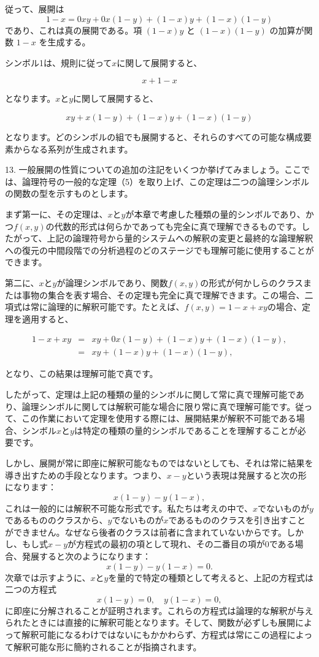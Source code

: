 \documentclass[a4paper,11pt,openany]{ltjsbook}
\begin{document}
従って、展開は
\[
1 - x = 0xy + 0x(1 - y) + (1 - x)y + (1 - x)(1 - y)
\]
であり、これは真の展開である。項 \( (1 - x)y \) と \( (1 - x)(1 - y) \) の加算が関数 \( 1 - x \) を生成する。

シンボル1は、規則に従って$x$に関して展開すると、

\[
x + 1 - x
\]

となります。$x$と$y$に関して展開すると、

\[
xy + x(1-y) + (1-x)y + (1-x)(1-y)
\]

となります。どのシンボルの組でも展開すると、それらのすべての可能な構成要素からなる系列が生成されます。

13. 一般展開の性質についての追加の注記をいくつか挙げてみましょう。ここでは、論理符号の一般的な定理（5）を取り上げ、この定理は二つの論理シンボルの関数の型を示すものとします。

まず第一に、その定理は、$x$と$y$が本章で考慮した種類の量的シンボルであり、かつ$f(x, y)$の代数的形式は何らかであっても完全に真で理解できるものです。したがって、上記の論理符号から量的システムへの解釈の変更と最終的な論理解釈への復元の中間段階での分析過程のどのステージでも理解可能に使用することができます。

第二に、$x$と$y$が論理シンボルであり、関数$f(x, y)$の形式が何かしらのクラスまたは事物の集合を表す場合、その定理も完全に真で理解できます。この場合、二項式は常に論理的に解釈可能です。たとえば、$f(x, y) = 1 - x + xy$の場合、定理を適用すると、

\begin{eqnarray*}
1-x+xy &=& xy+0x(1-y)+(1-x)y+(1-x)(1-y),\\
       &=& xy+(1-x)y+(1-x)(1-y),
\end{eqnarray*}

となり、この結果は理解可能で真です。

したがって、定理は上記の種類の量的シンボルに関して常に真で理解可能であり、論理シンボルに関しては解釈可能な場合に限り常に真で理解可能です。従って、この作業において定理を使用する際には、展開結果が解釈不可能である場合、シンボル$x$と$y$は特定の種類の量的シンボルであることを理解することが必要です。

しかし、展開が常に即座に解釈可能なものではないとしても、それは常に結果を導き出すための手段となります。つまり、$x-y$という表現は発展すると次の形になります：
\[
x(1-y) - y(1-x),
\]
これは一般的には解釈不可能な形式です。私たちは考えの中で、$x$でないものが$y$であるもののクラスから、$y$でないものが$x$であるもののクラスを引き出すことができません。なぜなら後者のクラスは前者に含まれていないからです。しかし、もし式$x - y$が方程式の最初の項として現れ、その二番目の項が$0$である場合、発展すると次のようになります：
\[
x(1-y) - y(1-x) = 0.
\]
次章では示すように、$x$と$y$を量的で特定の種類として考えると、上記の方程式は二つの方程式
\[
x(1-y) = 0, \quad y(1-x) = 0,
\]
に即座に分解されることが証明されます。これらの方程式は論理的な解釈が与えられたときには直接的に解釈可能となります。そして、関数が必ずしも展開によって解釈可能になるわけではないにもかかわらず、方程式は常にこの過程によって解釈可能な形に簡約されることが指摘されます。
\end{document}
